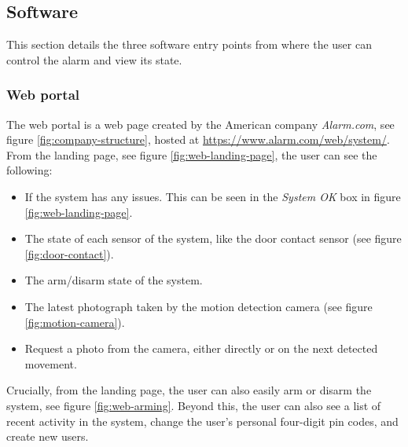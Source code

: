 \subsection{Software} \label{ch:system:software}
This section details the three software entry points from where the user can control the alarm and view its state.

\subsubsection{Web portal}
The web portal is a web page created by the American company \textit{Alarm.com}, see figure \ref{fig:company-structure}, hosted at \url{https://www.alarm.com/web/system/}. From the landing page, see figure \ref{fig:web-landing-page}, the user can see the following:
\begin{itemize}
    \item If the system has any issues. This can be seen in the \textit{System OK} box in figure \ref{fig:web-landing-page}.
    \item The state of each sensor of the system, like the door contact sensor (see figure \ref{fig:door-contact}).
    \item The arm/disarm state of the system.
    \item The latest photograph taken by the motion detection camera (see figure \ref{fig:motion-camera}).
    \item Request a photo from the camera, either directly or on the next detected movement.
\end{itemize}
Crucially, from the landing page, the user can also easily arm or disarm the system, see figure \ref{fig:web-arming}. Beyond this, the user can also see a list of recent activity in the system, change the user's personal four-digit pin codes, and create new users.

